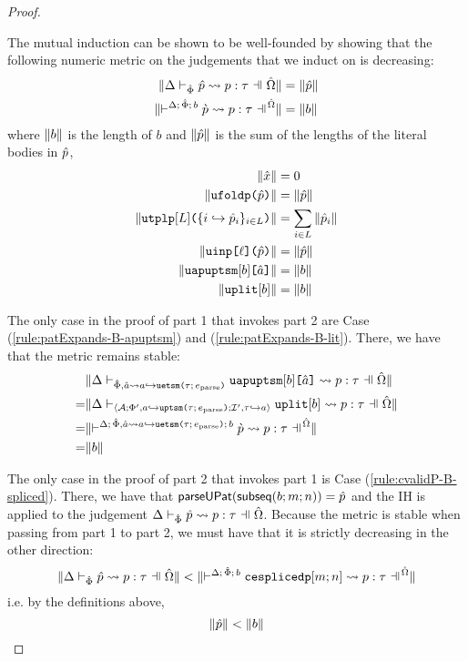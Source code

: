 \begin{proof}
\begin{enumerate}
\begin{byCases}
  \end{byCases}
\end{enumerate}
The mutual induction can be shown to be well-founded by showing that the following numeric metric on the judgements that we induct on is decreasing:
\begin{align*}
\sizeof{\patExpands{\upctx}{\uPhi}{\upv}{p}{\tau}} & = \sizeof{\upv}\\
\sizeof{{\cvalidP{\upctx}{\pscene{\Delta}{\uPhi}{b}}{\cpv}{p}{\tau}}} & = \sizeof{b}
\end{align*}
where $\Vert b \Vert$ is the length of $b$ and $\Vert \hat{p} \Vert$ is the sum of the lengths of the literal bodies in $\hat{p}$,
\begin{align*}
\Vert {\hat x} \Vert & = 0\\
\Vert \texttt{ufoldp}\texttt{(}\hat{p}\texttt{)} \Vert & = \Vert \hat{p} \Vert\\
\Vert \texttt{utplp}[L]\texttt{(}\{i \hookrightarrow \hat{p}_{i}\}_{i \in L}\texttt{)} \Vert & = \sum_{i \in L} \Vert \hat{p}_i \Vert\\
\Vert \texttt{uinp}\texttt{[}\ell\texttt{](}\hat{p}\texttt{)} \Vert & = \Vert \hat{p} \Vert\\
\Vert \texttt{uapuptsm}[b]\texttt{[}\hat{a}\texttt{]} \Vert & = \Vert b \Vert\\
\Vert \texttt{uplit}[b] \Vert & = \Vert b \Vert
\end{align*}

The only case in the proof of part 1 that invokes part 2 are Case (\ref{rule:patExpands-B-apuptsm}) and (\ref{rule:patExpands-B-lit}). There, we have that the metric remains stable: \begin{align*}
 & \sizeof{\patExpands{\upctx}{\uPhi, \uShyp{\tsmv}{a}{\tau}{\eparse}}{\auapuptsm{b}{\tsmv}}{p}{\tau}}\\
=& \sizeof{\patExpands{\upctx}{\uASI{\uA}{\Phi', \xuptsmbnd{a}{\tau}{\eparse}}{\uI', \designate{\tau}{a}}}{\auplit{b}}{p}{\tau}}\\
=& \sizeof{{\cvalidP{\upctx}{\pscene{\Delta}{\uPhi, \uShyp{\tsmv}{a}{\tau}{\eparse}}{b}}{\cpv}{p}{\tau}}}\\
=&\sizeof{b}\end{align*}

The only case in the proof of part 2 that invokes part 1 is Case (\ref{rule:cvalidP-B-spliced}). There, we have that $\mathsf{parseUPat}(\mathsf{subseq}(b; m; n))=\hat{p}$ and the IH is applied to the judgement $\patExpands{\upctx}{\uPhi}{\upv}{p}{\tau}$. Because the metric is stable when passing from part 1 to part 2, we must have that it is strictly decreasing in the other direction:
\[\sizeof{\patExpands{\upctx}{\uPhi}{\upv}{p}{\tau}} < \sizeof{{\cvalidP{\upctx}{\pscene{\Delta}{\uPhi}{b}}{\acesplicedp{m}{n}}{p}{\tau}}}\]
i.e. by the definitions above, 
\[\Vert \hat{p} \Vert < \Vert b \Vert\]


\end{proof}
